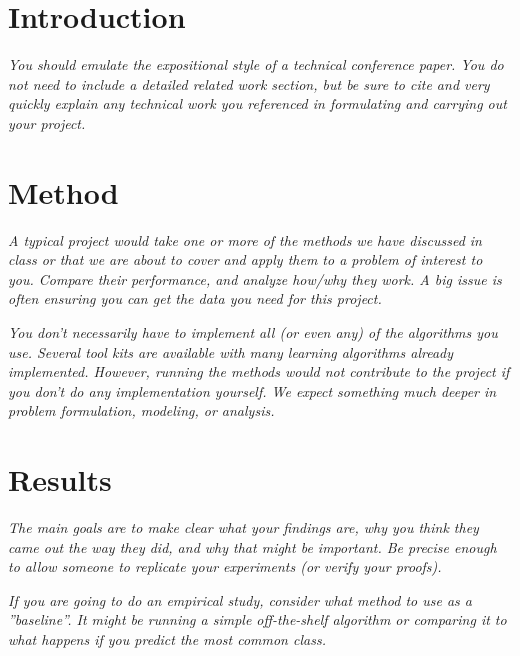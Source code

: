 \section{Introduction}

\textit{You should emulate the expositional style of a technical conference paper. You do not need to include a detailed related work section, but be sure to cite and very quickly explain any technical work you referenced in formulating and carrying out your project.}


\section{Method}
\textit{A typical project would take one or more of the methods we have discussed in class or that we are about to cover and apply them to a problem of interest to you. Compare their performance, and analyze how/why they work. A big issue is often ensuring you can get the data you need for this project.}



\textit{You don’t necessarily have to implement all (or even any) of the algorithms you use. Several tool kits are available with many learning algorithms already implemented. However, running the methods would not contribute to the project if you don’t do any implementation yourself. We expect something much deeper in problem formulation, modeling, or analysis.}


\section{Results}
\textit{The main goals are to make clear what your findings are, why you think they came out the way they did, and why that might be important. Be precise enough to allow someone to replicate your experiments (or verify your proofs).}


\textit{If you are going to do an empirical study, consider what method to use as a ”baseline”. It might be running a simple off-the-shelf algorithm or comparing it to what happens if you predict the most common class.}


